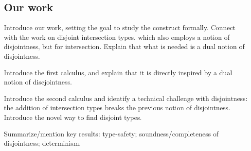 \subsection{Our work}

Introduce our work, setting the goal to study the construct formally.
Connect with the work on disjoint intersection types, which also
employs a notion of disjointness, but for intersection. Explain that
what is needed is a dual notion of disjointness.

Introduce the first calculus, and explain that it is directly inspired
by a dual notion of discjointness.

Introduce the second calculus and identify a technical challenge with
disjointness: the addition of intersection types breaks the previous
notion of disjointness. Introduce the novel way to find disjoint types. 

Summarize/mention key results: type-safety; soundness/completeness of
disjointness; determinism. 


